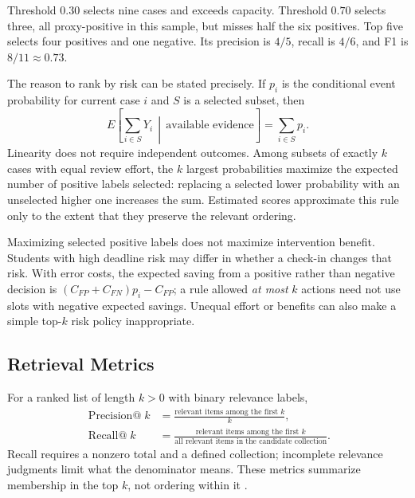 Threshold $0.30$ selects nine cases and exceeds capacity. Threshold $0.70$ selects three, all proxy-positive in this sample, but misses half the six positives. Top five selects four positives and one negative. Its precision is $4/5$, recall is $4/6$, and F1 is $8/11\approx0.73$.

\par\medskip\noindent\begin{minipage}{\linewidth}
The reason to rank by risk can be stated precisely. If $p_i$ is the conditional event probability for current case $i$ and $S$ is a selected subset, then
\[
E\left[\sum_{i\in S}Y_i\,\middle|\,\text{available evidence}\right]
=\sum_{i\in S}p_i.
\]
Linearity does not require independent outcomes. Among subsets of exactly $k$ cases with equal review effort, the $k$ largest probabilities maximize the expected number of positive labels selected: replacing a selected lower probability with an unselected higher one increases the sum. Estimated scores approximate this rule only to the extent that they preserve the relevant ordering.
\end{minipage}\par\medskip

Maximizing selected positive labels does not maximize intervention benefit. Students with high deadline risk may differ in whether a check-in changes that risk. With error costs, the expected saving from a positive rather than negative decision is $(C_{FP}+C_{FN})p_i-C_{FP}$; a rule allowed \emph{at most} $k$ actions need not use slots with negative expected savings. Unequal effort or benefits can also make a simple top-$k$ risk policy inappropriate.

\subsection{Retrieval Metrics}

For a ranked list of length $k>0$ with binary relevance labels,
\begin{align*}
\operatorname{Precision@}k&=\frac{\text{relevant items among the first }k}{k},\\
\operatorname{Recall@}k&=\frac{\text{relevant items among the first }k}{\text{all relevant items in the candidate collection}}.
\end{align*}
Recall requires a nonzero total and a defined collection; incomplete relevance judgments limit what the denominator means. These metrics summarize membership in the top $k$, not ordering within it \citep{manning2008}.

